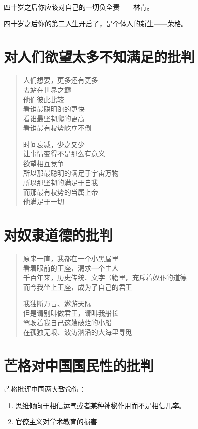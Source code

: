 \documentclass[12pt,oneside]{book}
\newenvironment{shici}{
\begin{verse}
\centering\large\hspace{12pt}}
{\end{verse}}
\begin{document}
四十岁之后你应该对自己的一切负全责——林肯。

四十岁之后你的第二人生开启了，是个体人的新生——荣格。


\chapter{对人们欲望太多不知满足的批判}
\begin{shici}
人们想要，更多还有更多\\
去站在世界之巅\\
他们彼此比较\\
看谁最聪明跑的更快\\
看谁最坚韧爬的更高\\
看谁最有权势屹立不倒

时间衰减，少之又少\\
让事情变得不是那么有意义\\
欲望相互竞争\\
所以那最聪明的满足于宇宙万物\\
所以那坚韧的满足于自我\\
而那最有权势的当属上帝\\
他满足于一切
\end{shici}



\chapter{对奴隶道德的批判}
\begin{shici}
原来一直，我都在一个小黑屋里\\
看着眼前的王座，渴求一个主人\\
千百年来，历史传统、文字书籍里，充斥着奴仆的道德\\
而今我坐上王座，成为了自己的君王 

我独断万古、遨游天际\\
但是请别叫做君王，请叫我船长\\
驾驶着我自己这艘破烂的小船\\
在孤独无垠、波涛汹涌的大海里寻觅 
\end{shici}

\chapter{芒格对中国国民性的批判}
芒格批评中国两大致命伤：

\begin{enumerate}
\item 思维倾向于相信运气或者某种神秘作用而不是相信几率。
\item 官僚主义对学术教育的损害
\end{enumerate}
\end{document}
